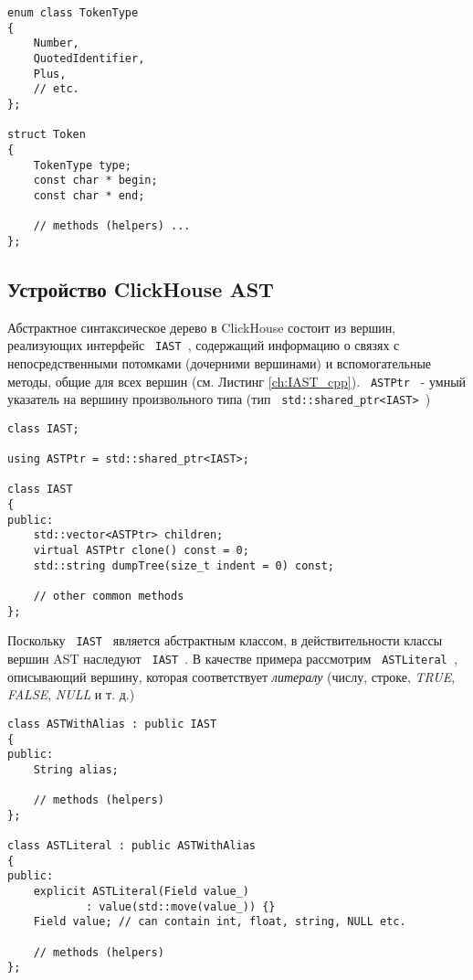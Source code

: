 \begin{code}
    \label{ch:token_cpp}
    \begin{verbatim}
enum class TokenType
{
    Number,
    QuotedIdentifier,
    Plus,
    // etc.
};

struct Token
{
    TokenType type;
    const char * begin;
    const char * end;
        
    // methods (helpers) ...
};
\end{verbatim}
\end{code}

\subsection{Устройство ClickHouse AST}
Абстрактное синтаксическое дерево в ClickHouse состоит из вершин, реализующих интерфейс \texttt{ IAST }, содержащий информацию о связях с непосредственными потомками (дочерними вершинами) и вспомогательные методы, общие для всех вершин (см. Листинг \ref{ch:IAST_cpp}). \texttt{ ASTPtr } - умный указатель на вершину произвольного типа (тип \texttt{ std::shared_ptr<IAST> })

\begin{code}
    \label{ch:IAST_cpp}
    \begin{verbatim}
class IAST;

using ASTPtr = std::shared_ptr<IAST>;

class IAST
{
public:
    std::vector<ASTPtr> children;
    virtual ASTPtr clone() const = 0;
    std::string dumpTree(size_t indent = 0) const;
    
    // other common methods
};
\end{verbatim}
\end{code}
Поскольку \texttt{ IAST } является абстрактным классом, в действительности классы вершин AST наследуют \texttt{ IAST }. В качестве примера рассмотрим \texttt{ ASTLiteral }, описывающий вершину, которая соответствует \textit{литералу} (числу, строке, \textit{TRUE}, \textit{FALSE}, \textit{NULL} и т. д.)

\begin{code}
    \label{ch:ASTLiteral_cpp}
    \begin{verbatim}
class ASTWithAlias : public IAST
{
public:
    String alias;

    // methods (helpers)
};

class ASTLiteral : public ASTWithAlias
{
public:
    explicit ASTLiteral(Field value_) 
            : value(std::move(value_)) {}
    Field value; // can contain int, float, string, NULL etc.

    // methods (helpers)
};        
    \end{verbatim}
\end{code}

